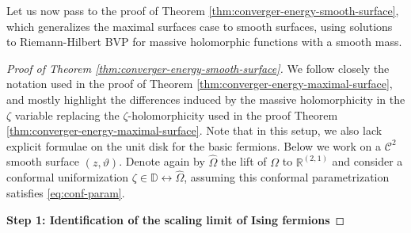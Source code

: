 \documentclass[reqno]{amsart}
\numberwithin{equation}{section}
\theoremstyle{definition}
\theoremstyle{remark}
\begin{document}
Let us now pass to the proof of Theorem \ref{thm:converger-energy-smooth-surface}, which generalizes the maximal surfaces case to smooth surfaces, using solutions to Riemann-Hilbert BVP for massive holomorphic functions with a smooth mass.
\begin{proof}[Proof of Theorem \ref{thm:converger-energy-smooth-surface}]
We follow closely the notation used in the proof of Theorem \ref{thm:converger-energy-maximal-surface}, and mostly highlight the differences induced by the massive holomorphicity in the $\zeta$ variable replacing the $\zeta$-holomorphicity used in the proof Theorem \ref{thm:converger-energy-maximal-surface}. Note that in this setup, we also lack explicit formulae on the unit disk for the basic fermions. Below we work on a $\mathcal{C}^2$ smooth surface $(z,\vartheta)$. Denote again by $\widehat{\Omega}$ the lift of  $\Omega$ to $\mathbb{R}^{(2,1)}$ and consider a conformal uniformization $\zeta \in \mathbb{D} \leftrightarrow  \widehat{\Omega}$, assuming this conformal parametrization satisfies \eqref{eq:conf-param}. 


\textbf{Step 1: Identification of the scaling limit of Ising fermions}


\end{proof}
\end{document}
